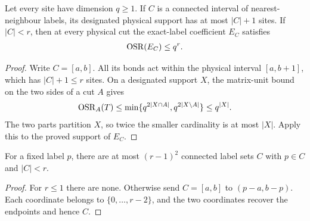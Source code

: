 \begin{lemma}
    \label{thm:physical_cluster_interval_rank}
    \leanok

    Let every site have dimension $q\geq1$. If $C$ is a connected
    interval of nearest-neighbour labels, its designated physical
    support has at most $|C|+1$ sites. If $|C|<r$, then at every
    physical cut the exact-label coefficient $E_C$ satisfies
    \begin{align}
        \operatorname{OSR}(E_C)\leq q^r.\notag
    \end{align}
\end{lemma}
\begin{proof}\leanok
    Write $C=[a,b]$. All its bonds act within the physical interval
    $[a,b+1]$, which has $|C|+1\leq r$ sites. On a designated support
    $X$, the matrix-unit bound on the two sides of a cut $A$ gives
    \begin{align}
        \operatorname{OSR}_A(T)
        \leq\min\{q^{2|X\cap A|},q^{2|X\setminus A|}\}
        \leq q^{|X|}.\notag
    \end{align}
    The two parts partition $X$, so twice the smaller cardinality
    is at most $|X|$. Apply this to the proved support of $E_C$.
\end{proof}

\begin{lemma}
    \label{thm:physical_cluster_crossing_count}
    \leanok

    For a fixed label $p$, there are at most $(r-1)^2$ connected
    label sets $C$ with $p\in C$ and $|C|<r$.
\end{lemma}
\begin{proof}\leanok
    For $r\leq1$ there are none. Otherwise send $C=[a,b]$ to
    $(p-a,b-p)$. Each coordinate belongs to $\{0,\ldots,r-2\}$,
    and the two coordinates recover the endpoints and hence $C$.
\end{proof}

